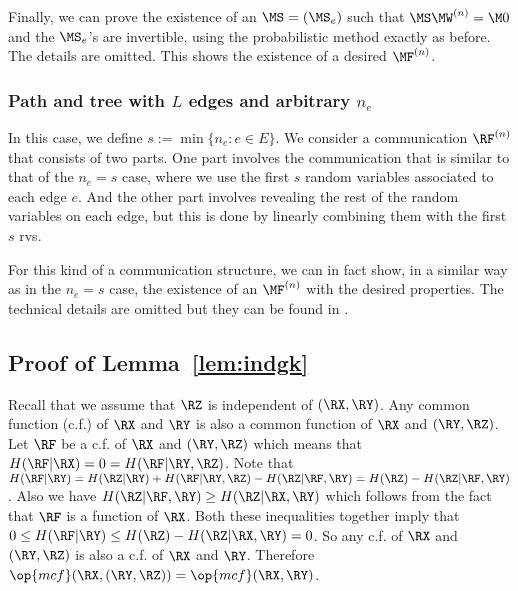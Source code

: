 Finally, we can prove the existence of an $\MS=(\MS_e)$ such that $\MS\MW^{(n)} =\M0$ and the $\MS_e$'s are invertible, using the probabilistic method exactly as before. The details are omitted.  This shows the existence of a desired $\MF^{(n)}$.

\subsubsection{Path and tree with $L$ edges  and arbitrary $n_e$}
In this case, we define $s := \min\{n_e: e \in E\}$. We consider a communication $\RF^{(n)}$ that consists of two parts. One part involves the communication that is similar to that of the $n_e =s$ case, where we use the first $s$ random variables associated to each edge $e$. And the other part involves revealing the rest of the random variables on each edge, but this is done by linearly combining them with the first $s$ rvs.

For this kind of a communication structure, we can in fact show, in a similar way as in the $n_e =s$ case, the existence of an $\MF^{(n)}$ with the desired properties. The technical details are omitted but they can be found in \cite{treepin21arxiv}.


\subsection{Proof of Lemma~\ref{lem:indgk}}\label{lem:mcf}
Recall that we assume that $\RZ$ is independent of  $(\RX,\RY)$.  Any common function (c.f.) of $\RX$ and $\RY$ is also a common function of $\RX$ and $(\RY,\RZ)$. Let $\RF$ be a c.f. of $\RX$ and $(\RY,\RZ)$ which means that $H(\RF|\RX)=0=H(\RF|\RY,\RZ)$. Note that $H(\RF|\RY)=H(\RZ|\RY)+H(\RF|\RY,\RZ)-H(\RZ|\RF,\RY)=H(\RZ)-H(\RZ|\RF,\RY)$. Also we have $H(\RZ|\RF,\RY) \geq H(\RZ|\RX,\RY)$ which follows from the  fact that $\RF$ is a function of $\RX$. Both these inequalities together imply that $0 \le H(\RF|\RY) \leq H(\RZ)-H(\RZ|\RX,\RY) =0$. So any c.f. of $\RX$ and $(\RY,\RZ)$ is also a c.f. of $\RX$ and $\RY$.  Therefore $\op{mcf}(\RX, (\RY,\RZ)) = \op{mcf}(\RX,\RY)$. 
 
